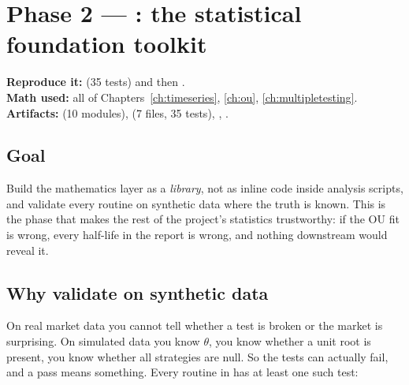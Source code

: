 \section{Phase 2 --- : the statistical foundation toolkit}
\label{ch:phase2}

\textbf{Reproduce it:}  (35 tests) and
 then .\\
\textbf{Math used:} all of Chapters~\ref{ch:timeseries}, \ref{ch:ou},
\ref{ch:multipletesting}.\\
\textbf{Artifacts:}  (10 modules), 
(7 files, 35 tests), ,
.

\subsection{Goal}

Build the mathematics layer as a \emph{library}, not as inline code inside analysis
scripts, and validate every routine on synthetic data where the truth is known. This is
the phase that makes the rest of the project's statistics trustworthy: if the OU fit is
wrong, every half-life in the report is wrong, and nothing downstream would reveal it.

\subsection{Why validate on synthetic data}

On real market data you cannot tell whether a test is broken or the market is surprising.
On simulated data you know $\theta$, you know whether a unit root is present, you know
whether all strategies are null. So the tests can actually fail, and a pass means
something. Every routine in  has at least one such test:

